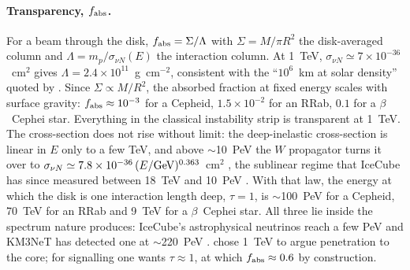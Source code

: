 \documentclass[final,5p]{elsarticle}
\newcommand{\bcep}{\ensuremath{\beta}~Cephei}
\begin{document}
\paragraph{Transparency, $f_{\rm abs}$.} For a beam through the disk, $f_{\rm abs}=\Sigma/\Lambda$ with $\Sigma=M/\pi R^2$ the disk-averaged column and $\Lambda=m_p/\sigma_{\nu N}(E)$ the interaction column. At 1~TeV, $\sigma_{\nu N}\simeq7\times10^{-36}$~cm$^2$ gives $\Lambda=2.4\times10^{11}$~g~cm$^{-2}$, consistent with the ``$10^6$~km at solar density'' quoted by \citet{Learned2008}. Since $\Sigma\propto M/R^2$, the absorbed fraction at fixed energy scales with surface gravity: $f_{\rm abs}\approx10^{-3}$ for a Cepheid, $1.5\times10^{-2}$ for an RRab, $0.1$ for a \bcep{} star. Everything in the classical instability strip is transparent at 1~TeV. The cross-section does not rise without limit: the deep-inelastic cross-section is linear in $E$ only to a few TeV, and above $\sim$10~PeV the $W$ propagator turns it over to { $\sigma_{\nu N}\simeq7.8\times10^{-36}\,(E/{\rm GeV})^{0.363}$}~cm$^2$ \citep{Gandhi1996, Gandhi1998}, the sublinear regime that IceCube has since measured between 18~TeV and 10~PeV \citep{Bustamante2019, IceCube2021xsec}. With that law, the energy at which the disk is one interaction length deep, $\tau=1$, is $\sim$100~PeV for a Cepheid, 70~TeV for an RRab and 9~TeV for a \bcep{} star. All three lie inside the spectrum nature produces: IceCube's astrophysical neutrinos reach a few PeV \citep{IceCube2013pev, IceCube2014} and KM3NeT has detected one at $\sim$220~PeV \citep{KM3NeT2025}. \citet{Learned2008} chose 1~TeV to argue penetration to the core; for signalling one wants $\tau\approx1$, at which $f_{\rm abs}\approx0.6$ by construction.
\end{document}
